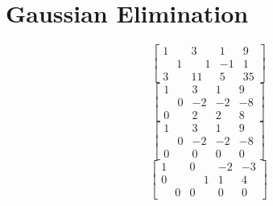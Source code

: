 \documentclass[]{article}
\begin{document}
\section*{Gaussian Elimination}


\Large
\[
\left[\begin{array}{rrr|r}
1 & 3 & 1 & 9 \\
\phantom{-}1 & \phantom{-}1 & -1 & 1 \\
3 & 11 & 5 & 35
\end{array}\right]  \]
\[\left[\begin{array}{rrr|r}
1 & 3 & 1 & 9 \\
\phantom{-}0 & -2 & -2 & -8 \\
0 & 2 & 2 & 8
\end{array}\right]
\]
\[\left[\begin{array}{rrr|r}
1 & 3 & 1 & 9 \\
\phantom{-}0 & -2 & -2 & -8 \\
0 & 0 & 0 & 0
\end{array}\right]\]
\[\left[\begin{array}{rrr|r}
1 & 0 & -2 & -3 \\
0 & \phantom{-}1 & 1 & 4 \\
\phantom{-}0 & 0 & 0 & 0
\end{array}\right] \]
\end{document}

